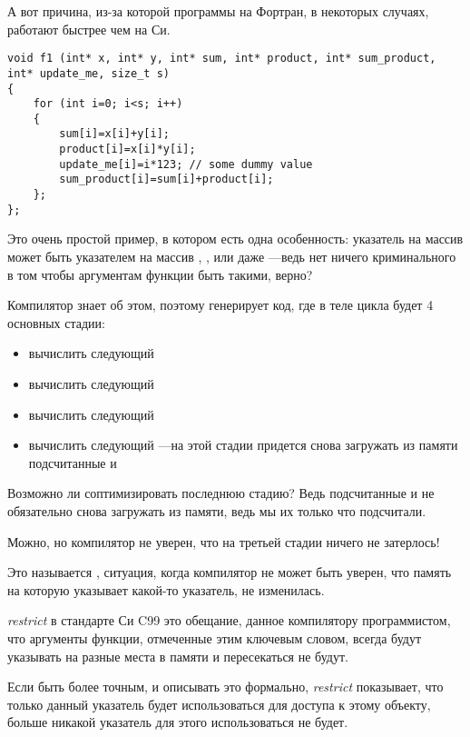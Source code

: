 
А вот причина, из-за которой программы на Фортран, в некоторых случаях, работают быстрее чем на Си.

\begin{lstlisting}[style=customc]
void f1 (int* x, int* y, int* sum, int* product, int* sum_product, int* update_me, size_t s)
{
	for (int i=0; i<s; i++)
	{
		sum[i]=x[i]+y[i];
		product[i]=x[i]*y[i];
		update_me[i]=i*123; // some dummy value
		sum_product[i]=sum[i]+product[i];	
	};
};
\end{lstlisting}

Это очень простой пример, в котором есть одна особенность: 
указатель на массив  может быть указателем на массив
, , или даже 
---ведь нет ничего криминального в том 
чтобы аргументам функции быть такими, верно?

Компилятор знает об этом, поэтому генерирует код, где в теле цикла будет 4 основных стадии:

\begin{itemize}
\item вычислить следующий 
\item вычислить следующий 
\item вычислить следующий 
\item вычислить следующий ---на этой стадии придется снова загружать из памяти подсчитанные
  и 
\end{itemize}

Возможно ли соптимизировать последнюю стадию?
Ведь подсчитанные  и  
не обязательно снова загружать из памяти, ведь мы их только что подсчитали.

Можно, но компилятор не уверен, что на третьей стадии ничего не затерлось!

Это называется
, ситуация, когда компилятор не может быть уверен, что память на которую указывает 
какой-то указатель, не изменилась.

\emph{restrict} в стандарте Си C99 
это обещание, данное компилятору программистом, что аргументы функции, отмеченные этим ключевым словом,
всегда будут указывать на разные места в памяти и пересекаться не будут.

Если быть более точным, и описывать это формально, \emph{restrict} показывает, что только данный указатель будет
использоваться для доступа к этому объекту, больше никакой указатель для
этого использоваться не будет.

